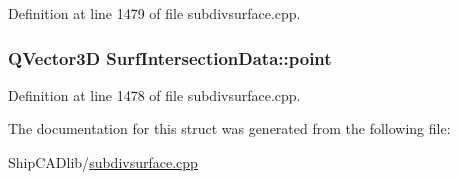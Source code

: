 Definition at line 1479 of file subdivsurface.\-cpp.

\hypertarget{structSurfIntersectionData_a789d1758e7035fdf5b902861e936113a}{
\subsubsection[{point}]{\setlength{\rightskip}{0pt plus 5cm}Q\-Vector3\-D Surf\-Intersection\-Data\-::point}}\label{structSurfIntersectionData_a789d1758e7035fdf5b902861e936113a}


Definition at line 1478 of file subdivsurface.\-cpp.



The documentation for this struct was generated from the following file\-:\begin{DoxyCompactItemize}
\item 
Ship\-C\-A\-Dlib/\hyperlink{subdivsurface_8cpp}{subdivsurface.\-cpp}\end{DoxyCompactItemize}
